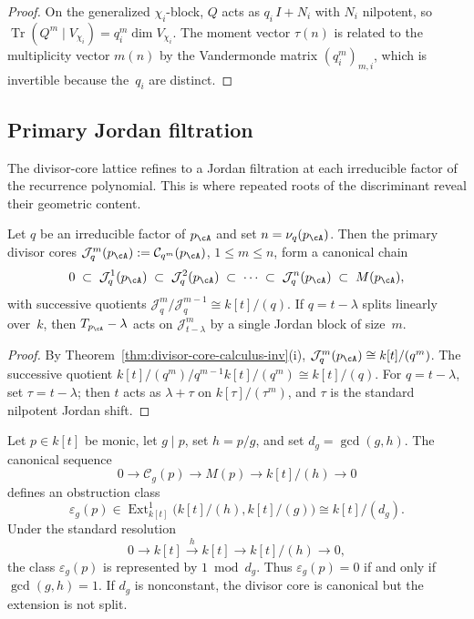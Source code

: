 \begin{proof}
On the generalized $\chi_i$-block, $Q$ acts as
$q_i\,I + N_i$ with $N_i$ nilpotent, so
$\operatorname{Tr}(Q^m \mid V_{\chi_i})
 = q_i^m\dim V_{\chi_i}$.
The moment vector $\tau(n)$ is related to the multiplicity
vector $m(n)$ by the Vandermonde matrix
$(q_i^m)_{m,i}$, which is invertible because the~$q_i$ are
distinct.
\end{proof}

\subsection{Primary Jordan filtration}
\label{subsec:primary-jordan}

The divisor-core lattice refines to a Jordan filtration at
each irreducible factor of the recurrence polynomial. This
is where repeated roots of the discriminant reveal their
geometric content.

\begin{theorem}
\label{thm:primary-jordan-filtration-inv}
Let $q$ be an irreducible factor of $p_\cA$ and set
$n = \nu_q(p_\cA)$. Then the primary divisor cores
$\mathcal{J}_q^m(p_\cA) := \mathcal{C}_{q^m}(p_\cA)$,
$1 \leq m \leq n$, form a canonical chain
\[
0 \;\subset\;
 \mathcal{J}_q^1(p_\cA) \;\subset\;
 \mathcal{J}_q^2(p_\cA) \;\subset\;
 \cdots \;\subset\;
 \mathcal{J}_q^n(p_\cA)
 \;\subset\; M(p_\cA),
\]
with successive quotients
$\mathcal{J}_q^m / \mathcal{J}_q^{m-1} \cong k[t]/(q)$.
If $q = t - \lambda$ splits linearly over~$k$, then
$T_{p_\cA} - \lambda$ acts on $\mathcal{J}_{t-\lambda}^m$
by a single Jordan block of size~$m$.
\end{theorem}

\begin{proof}
By Theorem~\ref{thm:divisor-core-calculus-inv}(i),
$\mathcal{J}_q^m(p_\cA) \cong k[t]/(q^m)$. The successive
quotient $k[t]/(q^m) \big/ q^{m-1}k[t]/(q^m) \cong k[t]/(q)$.
For $q = t-\lambda$, set $\tau = t-\lambda$; then $t$ acts as
$\lambda + \tau$ on $k[\tau]/(\tau^m)$, and $\tau$ is the
standard nilpotent Jordan shift.
\end{proof}

\begin{corollary}
\label{cor:repeated-roots-extension-data}
Let $p \in k[t]$ be monic, let $g \mid p$, set $h=p/g$, and set
$d_g=\gcd(g,h)$. The canonical sequence
\[
0 \longrightarrow \mathcal C_g(p)
\longrightarrow M(p)
\longrightarrow k[t]/(h)
\longrightarrow 0
\]
defines an obstruction class
\[
\varepsilon_g(p)\in
\operatorname{Ext}^1_{k[t]}\!\bigl(k[t]/(h),k[t]/(g)\bigr)
\cong k[t]/(d_g).
\]
Under the standard resolution
\[
0 \longrightarrow k[t]\xrightarrow{\;h\;}k[t]
\longrightarrow k[t]/(h)\longrightarrow 0,
\]
the class $\varepsilon_g(p)$ is represented by $1\bmod d_g$.
Thus $\varepsilon_g(p)=0$ if and only if $\gcd(g,h)=1$.
If $d_g$ is nonconstant, the divisor core is canonical but the
extension is not split.
\end{corollary}


